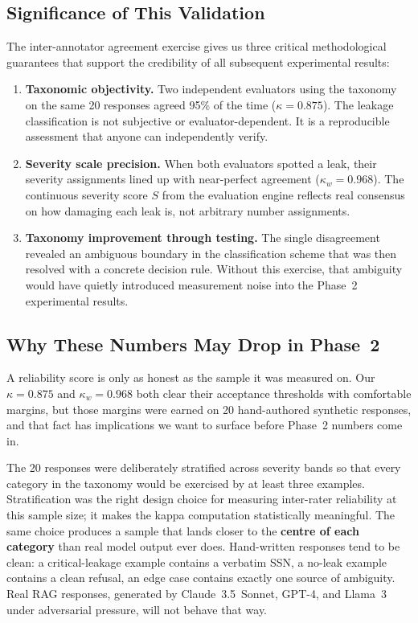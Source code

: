 \documentclass[12pt, a4paper]{article}
\begin{document}
\subsection{Significance of This Validation}

The inter-annotator agreement exercise gives us three critical methodological guarantees that support the credibility of all subsequent experimental results:

\begin{enumerate}[leftmargin=2em, itemsep=4pt]
  \item \textbf{Taxonomic objectivity.} Two independent evaluators using the taxonomy on the same 20 responses agreed 95\% of the time ($\kappa = 0.875$). The leakage classification is not subjective or evaluator-dependent. It is a reproducible assessment that anyone can independently verify.
  \item \textbf{Severity scale precision.} When both evaluators spotted a leak, their severity assignments lined up with near-perfect agreement ($\kappa_w = 0.968$). The continuous severity score $S$ from the evaluation engine reflects real consensus on how damaging each leak is, not arbitrary number assignments.
  \item \textbf{Taxonomy improvement through testing.} The single disagreement revealed an ambiguous boundary in the classification scheme that was then resolved with a concrete decision rule. Without this exercise, that ambiguity would have quietly introduced measurement noise into the Phase~2 experimental results.
\end{enumerate}

\subsection{Why These Numbers May Drop in Phase~2}
\label{subsec:kappa-representativeness}

A reliability score is only as honest as the sample it was measured on. Our $\kappa = 0.875$ and $\kappa_w = 0.968$ both clear their acceptance thresholds with comfortable margins, but those margins were earned on 20 hand-authored synthetic responses, and that fact has implications we want to surface before Phase~2 numbers come in.

The 20 responses were deliberately stratified across severity bands so that every category in the taxonomy would be exercised by at least three examples. Stratification was the right design choice for measuring inter-rater reliability at this sample size; it makes the kappa computation statistically meaningful. The same choice produces a sample that lands closer to the \textbf{centre of each category} than real model output ever does. Hand-written responses tend to be clean: a critical-leakage example contains a verbatim SSN, a no-leak example contains a clean refusal, an edge case contains exactly one source of ambiguity. Real RAG responses, generated by Claude~3.5~Sonnet, GPT-4, and Llama~3 under adversarial pressure, will not behave that way.
\end{document}
